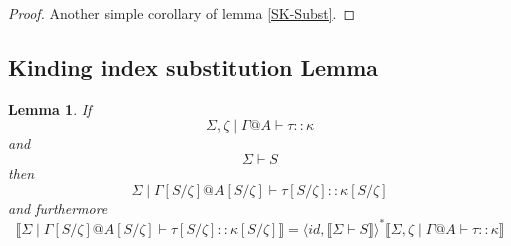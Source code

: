 \documentclass{article}
\newtheorem{lemma}{Lemma}
\newcommand{\sem}[1]{\llbracket #1 \rrbracket}
\begin{document}
\begin{proof}
Another simple corollary of lemma \ref{SK-Subst}.
\end{proof}

\subsection*{Kinding index substitution Lemma}

\begin{lemma}
If $$\Sigma,\zeta \mid \Gamma @ A \vdash \tau :: \kappa$$ and $$\Sigma \vdash S$$ then $$\Sigma \mid \Gamma[S/\zeta] @ A[S/\zeta] \vdash \tau[S/\zeta ] :: \kappa [S/\zeta ]$$ and furthermore $$\sem{\Sigma \mid \Gamma[S/\zeta] @ A[S/\zeta] \vdash \tau[S/\zeta] :: \kappa[S/\zeta]} = \langle \mathit{id}, \sem{\Sigma \vdash S} \rangle^* \sem{\Sigma,\zeta \mid \Gamma @ A \vdash \tau :: \kappa}$$
\end{lemma}
\end{document}
